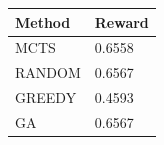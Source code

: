 \begin{tabular}{ll}
\hline
Method & Reward \\
\hline
  MCTS & 0.6558 \\
  RANDOM & 0.6567 \\
  GREEDY & 0.4593 \\
  GA & 0.6567 \\
\hline
\end{tabular}
